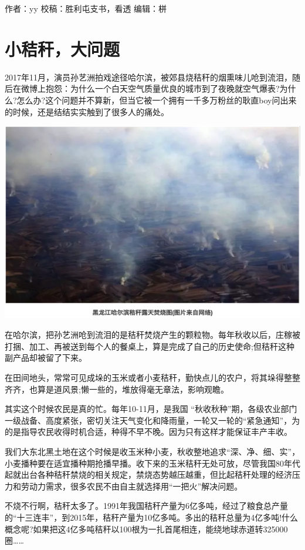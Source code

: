 \documentclass[
]{book}
\begin{document}
作者：yy
校稿：胜利屯支书，看透
编辑：栟

\hypertarget{ux5c0fux79f8ux79c6ux5927ux95eeux9898}{%
\section{小秸秆，大问题}\label{ux5c0fux79f8ux79c6ux5927ux95eeux9898}}

2017年11月，演员孙艺洲拍戏途径哈尔滨，被郊县烧秸秆的烟熏味儿呛到流泪，随后在微博上抱怨：为什么一个白天空气质量优良的城市到了夜晚就空气爆表?为什么?怎么办?这个问题并不算新，但当它被一个拥有一千多万粉丝的耿直boy问出来的时候，还是结结实实触到了很多人的痛处。

\includegraphics[width=8.33in]{images/stalk1}

在哈尔滨，把孙艺洲呛到流泪的是秸秆焚烧产生的颗粒物。每年秋收以后，庄稼被打捆、加工、再被送到每个人的餐桌上，算是完成了自己的历史使命;但秸秆这种副产品却被留了下来。

在田间地头，常常可见成垛的玉米或者小麦秸秆，勤快点儿的农户，将其垛得整整齐齐，也算是道风景;懒一些的，堆放得毫无章法，影响观瞻。

其实这个时候农民是真的忙。每年10-11月，是我国 ``秋收秋种''期，各级农业部门一级战备、高度紧张，密切关注天气变化和降雨量，一轮又一轮的``紧急通知''，为的是指导农民收得时机合适，种得不早不晚。因为只有这样才能保证丰产丰收。

我们大东北黑土地在这个时候是收玉米种小麦，秋收整地追求``深、净、细、实''，小麦播种要在适宜播种期抢播早播。收下来的玉米秸秆无处可放，尽管我国80年代起就出台各种秸秆禁烧的相关规定，禁烧态势越压越重，但比起秸秆处理的经济压力和劳动力需求，很多农民不由自主就选择用``一把火''解决问题。

不烧不行啊，秸秆太多了。1991年我国秸秆产量为6亿多吨，经过了粮食总产量的``十三连丰''，到2015年，秸秆产量为10亿多吨。多出的秸秆总量为4亿多吨!什么概念呢?如果把这4亿多吨秸秆以100根为一扎首尾相连，能绕地球赤道转325000圈\ldots\ldots{}
\end{document}
